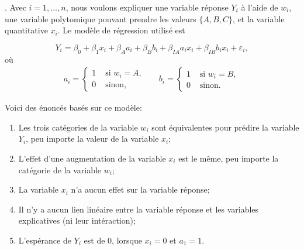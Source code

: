 \begin{questions}
\begin{parts}
\end{parts}
\vspace{5cm}

\newpage
.
\newpage
\question Avec $i=1,\hdots,n$, nous voulons expliquer une variable réponse $Y_i$ à l'aide de $w_i$, une variable polytomique pouvant prendre les valeurs $\{A,B,C\}$, et la variable quantitative $x_i$. Le modèle de régression utilisé est 

\begin{equation*}
    Y_i=\beta_0 + \beta_1 x_i + \beta_{A} a_{i} + \beta_B b_i + \beta_{IA}a_i x_i+ \beta_{IB}b_i x_i + \varepsilon_i,
\end{equation*}
où 
\begin{align*}
    a_i =\left\{
			\begin{array}{ll}
			1  & \mbox{ si } w_i=A, \\
			0 & \mbox{ sinon, }
   \end{array}
			\right. & & b_i =\left\{
			\begin{array}{ll}
			1  & \mbox{ si } w_i=B, \\
			0 & \mbox{ sinon. }
   \end{array}
			\right. 
\end{align*}

Voici des énoncés basés sur ce modèle:

\begin{enumerate}
    \item Les trois catégories de la variable $w_i$ sont équivalentes pour prédire la variable $Y_i$, peu importe la valeur de la variable $x_i$;
    \item L'effet d'une augmentation de la variable $x_i$ est le même, peu importe la catégorie de la variable $w_i$;
    \item La variable $x_i$ n'a aucun effet sur la variable réponse;
    \item Il n'y a aucun lien linéaire entre la variable réponse et les variables explicatives (ni leur intéraction); 
    \item L'espérance de $Y_i$ est de $0$, lorsque $x_i=0$ et $a_1=1$.
\end{enumerate}

\vspace{0.25cm}
\begin{parts}
    

\end{parts}
\end{questions}
